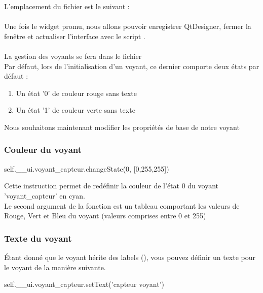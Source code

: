 {L'emplacement du fichier  est le suivant : \\

 \\


Une fois le widget promu, nous allons pouvoir enregistrer QtDesigner, fermer la fenêtre et actualiser l'interface avec le script .\\ \\

La gestion des voyants se fera dans le fichier  \\


Par défaut, lors de l'initialisation d'un voyant, ce dernier comporte deux états par défaut : 


\begin{enumerate}
    \item Un état '0' de couleur rouge sans texte
    \item Un état '1' de couleur verte sans texte
\end{enumerate}

Nous souhaitons maintenant modifier les propriétés de base de notre voyant

\subsubsection{Couleur du voyant}

\begin{Python}
self.__ui.voyant_capteur.changeState(0, [0,255,255]) 
\end{Python}
Cette instruction permet de redéfinir la couleur de l'état 0 du voyant 'voyant\_capteur' en cyan. \\
Le second argument de la fonction  est un tableau comportant les valeurs de Rouge, Vert et Bleu du voyant (valeurs comprises entre 0 et 255) \\

\subsubsection{Texte du voyant}

Étant donné que le voyant hérite des labels (), vous pouvez définir un texte pour le voyant de la manière suivante.

\begin{Python}
self.__ui.voyant_capteur.setText('capteur voyant')
\end{Python}


}
